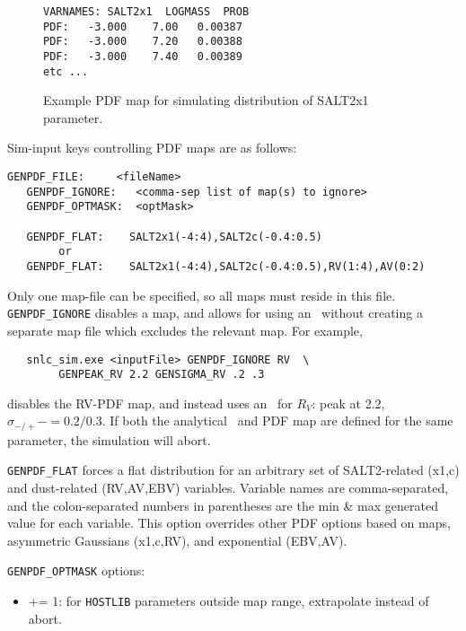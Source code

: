 \documentclass[12pt]{article}
\begin{document}
\begin{figure} [ht] 
\begin{center}
\begin{Verbatim}[frame=single]
VARNAMES: SALT2x1  LOGMASS  PROB 
PDF:   -3.000    7.00   0.00387 
PDF:   -3.000    7.20   0.00388
PDF:   -3.000    7.40   0.00389 
etc ...
\end{Verbatim}
\end{center}
\vspace{-0.8cm}
\caption{
  Example PDF map for simulating distribution of SALT2x1 parameter.
 }
\label{fig:genpdf_file}
\end{figure}

Sim-input keys controlling PDF maps are as follows:
\begin{Verbatim}[frame=single]
   GENPDF_FILE:     <fileName>
   GENPDF_IGNORE:   <comma-sep list of map(s) to ignore>
   GENPDF_OPTMASK:  <optMask>

   GENPDF_FLAT:    SALT2x1(-4:4),SALT2c(-0.4:0.5)
        or
   GENPDF_FLAT:    SALT2x1(-4:4),SALT2c(-0.4:0.5),RV(1:4),AV(0:2) 
\end{Verbatim}
%
Only one map-file can be specified, so all maps must reside in this file.
{\tt GENPDF\_IGNORE} disables a map, and allows for using an \AG\
without creating a separate map file which excludes
the relevant map. For example,
\begin{verbatim}
   snlc_sim.exe <inputFile> GENPDF_IGNORE RV  \
        GENPEAK_RV 2.2 GENSIGMA_RV .2 .3
\end{verbatim}
%
disables the RV-PDF map, and instead uses an \AG\ for 
$R_V$:  peak at 2.2, $\sigma_{-/+} -= 0.2/0.3$.
If both the analytical \AG\ and PDF map are defined for the same
parameter, the simulation will abort. 

\clearpage
{\tt GENPDF\_FLAT} forces a flat distribution for an arbitrary
set of SALT2-related (x1,c) and dust-related (RV,AV,EBV) variables.
Variable names are comma-separated, 
and the colon-separated numbers in parentheses are the 
min \& max generated value for each variable.
This option overrides other PDF options based on
maps, asymmetric Gaussians (x1,c,RV), and exponential (EBV,AV).

\medskip\noindent
{\tt GENPDF\_OPTMASK} options:
\begin{itemize}
  \item {+= 1:} for {\tt HOSTLIB} parameters outside map range,
       extrapolate instead of abort. 
\end{itemize}  
\end{document}
